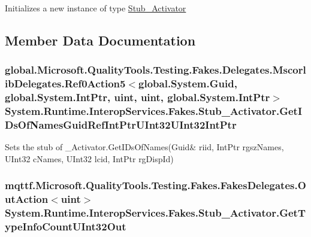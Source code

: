 Initializes a new instance of type \hyperlink{class_system_1_1_runtime_1_1_interop_services_1_1_fakes_1_1_stub___activator}{Stub\-\_\-\-Activator}



\subsection{Member Data Documentation}
\hypertarget{class_system_1_1_runtime_1_1_interop_services_1_1_fakes_1_1_stub___activator_a32be38ad494ca50d2932cd23c84dc5d1}{
\subsubsection[{Get\-I\-Ds\-Of\-Names\-Guid\-Ref\-Int\-Ptr\-U\-Int32\-U\-Int32\-Int\-Ptr}]{\setlength{\rightskip}{0pt plus 5cm}global.\-Microsoft.\-Quality\-Tools.\-Testing.\-Fakes.\-Delegates.\-Mscorlib\-Delegates.\-Ref0\-Action5$<$global.\-System.\-Guid, global.\-System.\-Int\-Ptr, uint, uint, global.\-System.\-Int\-Ptr$>$ System.\-Runtime.\-Interop\-Services.\-Fakes.\-Stub\-\_\-\-Activator.\-Get\-I\-Ds\-Of\-Names\-Guid\-Ref\-Int\-Ptr\-U\-Int32\-U\-Int32\-Int\-Ptr}}\label{class_system_1_1_runtime_1_1_interop_services_1_1_fakes_1_1_stub___activator_a32be38ad494ca50d2932cd23c84dc5d1}


Sets the stub of \-\_\-\-Activator.\-Get\-I\-Ds\-Of\-Names(Guid\& riid, Int\-Ptr rgsz\-Names, U\-Int32 c\-Names, U\-Int32 lcid, Int\-Ptr rg\-Disp\-Id)

\hypertarget{class_system_1_1_runtime_1_1_interop_services_1_1_fakes_1_1_stub___activator_ab72cb6a15d0f65766478978c6e4ff67b}{
\subsubsection[{Get\-Type\-Info\-Count\-U\-Int32\-Out}]{\setlength{\rightskip}{0pt plus 5cm}mqttf.\-Microsoft.\-Quality\-Tools.\-Testing.\-Fakes.\-Fakes\-Delegates.\-Out\-Action$<$uint$>$ System.\-Runtime.\-Interop\-Services.\-Fakes.\-Stub\-\_\-\-Activator.\-Get\-Type\-Info\-Count\-U\-Int32\-Out}}\label{class_system_1_1_runtime_1_1_interop_services_1_1_fakes_1_1_stub___activator_ab72cb6a15d0f65766478978c6e4ff67b}



